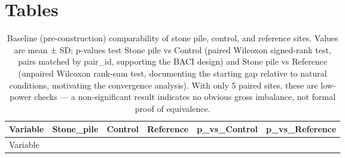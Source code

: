 \documentclass[
  12pt,
  a4paper,
]{scrbook}
\begin{document}

\chapter{Tables}\label{tables-2}

\begin{longtable}[]{@{}
  >{\raggedright\arraybackslash}p{}
  >{\raggedright\arraybackslash}p{}
  >{\raggedright\arraybackslash}p{}
  >{\raggedright\arraybackslash}p{}
  >{\raggedleft\arraybackslash}p{}
  >{\raggedleft\arraybackslash}p{}@{}}
\caption{Baseline (pre-construction) comparability of stone pile,
control, and reference sites. Values are mean ± SD; p-values test Stone
pile vs Control (paired Wilcoxon signed-rank test, pairs matched by
pair\_id, supporting the BACI design) and Stone pile vs Reference
(unpaired Wilcoxon rank-sum test, documenting the starting gap relative
to natural conditions, motivating the convergence analysis). With only 5
paired sites, these are low-power checks --- a non-significant result
indicates no obvious gross imbalance, not formal proof of
equivalence.}\tabularnewline
\toprule\noalign{}
\begin{minipage}[b]{\linewidth}\raggedright
Variable
\end{minipage} & \begin{minipage}[b]{\linewidth}\raggedright
Stone\_pile
\end{minipage} & \begin{minipage}[b]{\linewidth}\raggedright
Control
\end{minipage} & \begin{minipage}[b]{\linewidth}\raggedright
Reference
\end{minipage} & \begin{minipage}[b]{\linewidth}\raggedleft
p\_vs\_Control
\end{minipage} & \begin{minipage}[b]{\linewidth}\raggedleft
p\_vs\_Reference
\end{minipage} \\
\midrule\noalign{}
\endfirsthead
\toprule\noalign{}
\begin{minipage}[b]{\linewidth}\raggedright
Variable
\end{minipage} & \begin{minipage}[b]{\linewidth}\raggedright

\end{minipage}
\end{longtable}
\end{document}
